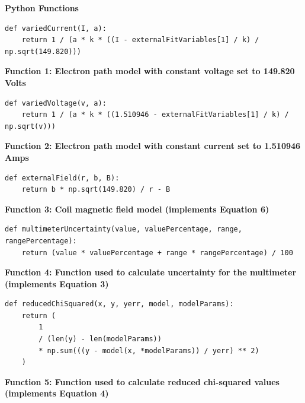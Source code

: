 \documentclass[
	letterpaper, %
	10pt, %
]{CSUniSchoolLabReport}
\begin{document}
\newpage
{\Large\textbf{Python Functions}}
\begin{verbatim}
def variedCurrent(I, a):
    return 1 / (a * k * ((I - externalFitVariables[1] / k) / np.sqrt(149.820)))
\end{verbatim}
\begin{center}
		\textbf{Function 1: Electron path model with constant voltage set to 149.820 Volts}
	\end{center}
\begin{verbatim}
def variedVoltage(v, a):
    return 1 / (a * k * ((1.510946 - externalFitVariables[1] / k) / np.sqrt(v)))
\end{verbatim}
\begin{center}
	\textbf{Function 2: Electron path model with constant current set to 1.510946 Amps}
\end{center}
\begin{verbatim}
def externalField(r, b, B):
    return b * np.sqrt(149.820) / r - B
\end{verbatim}
\begin{center}
	\textbf{Function 3: Coil magnetic field model (implements Equation 6)}
\end{center}
\begin{verbatim}
def multimeterUncertainty(value, valuePercentage, range, rangePercentage):
    return (value * valuePercentage + range * rangePercentage) / 100
\end{verbatim}
\begin{center}
	\textbf{Function 4: Function used to calculate uncertainty for the multimeter (implements Equation 3)}
\end{center}

\begin{verbatim}
def reducedChiSquared(x, y, yerr, model, modelParams):
    return (
        1
        / (len(y) - len(modelParams))
        * np.sum(((y - model(x, *modelParams)) / yerr) ** 2)
    )
\end{verbatim}
\begin{center}
	\textbf{Function 5: Function used to calculate reduced chi-squared values (implements Equation 4)}
\end{center}
\end{document}
